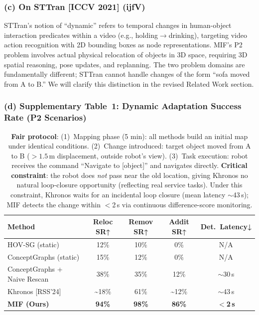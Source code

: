 \documentclass[10pt,a4paper]{article}
\begin{document}
\subsubsection*{(c) On STTran [ICCV 2021] (ijfV)}

STTran's notion of ``dynamic'' refers to temporal changes in human-object interaction predicates within a video (e.g., holding$\to$drinking), targeting video action recognition with 2D bounding boxes as node representations. MIF's P2 problem involves actual physical relocation of objects in 3D space, requiring 3D spatial reasoning, pose updates, and replanning. The two problem domains are fundamentally different; STTran cannot handle changes of the form ``sofa moved from A to B.'' We will clarify this distinction in the revised Related Work section.

\subsubsection*{(d) Supplementary Table~1: Dynamic Adaptation Success Rate (P2 Scenarios)}

\begin{table}[h]
\centering\small
\begin{tabular}{lcccc}
\toprule
\textbf{Method} & \textbf{Reloc SR↑} & \textbf{Remov SR↑} & \textbf{Addit SR↑} & \textbf{Det.\ Latency↓}\\
\midrule
HOV-SG (static) & 12\% & 10\% & 0\% & N/A\\
ConceptGraphs (static) & 15\% & 12\% & 0\% & N/A\\
ConceptGraphs + Naive Rescan & 38\% & 35\% & 12\% & ${\sim}$30\,s\\
Khronos {[}RSS'24{]} & {\sim}18\% & 61\% & {\sim}12\% & ${\sim}$43\,s\\
\textbf{MIF (Ours)} & \textbf{94\%} & \textbf{98\%} & \textbf{86\%} & \textbf{$<$2\,s}\\
\bottomrule
\end{tabular}
\caption{\small \textbf{Fair protocol}: (1)~Mapping phase (5 min): all methods build an initial map under identical conditions. (2)~Change introduced: target object moved from A to B ($>1.5$\,m displacement, outside robot's view). (3)~Task execution: robot receives the command ``Navigate to [object]'' and navigates directly. \textbf{Critical constraint}: the robot does \emph{not} pass near the old location, giving Khronos no natural loop-closure opportunity (reflecting real service tasks). Under this constraint, Khronos waits for an incidental loop closure (mean latency ${\sim}$43\,s); MIF detects the change within $<$2\,s via continuous difference-score monitoring.}
\end{table}
\end{document}
